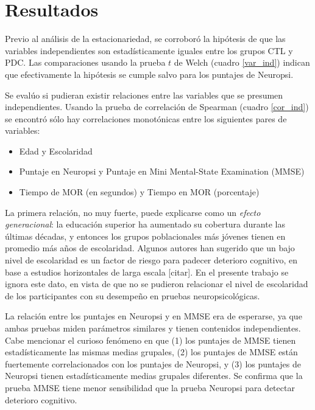 
\chapter{Resultados}

Previo al análisis de la estacionariedad, se corroboró la hipótesis de que las variables 
independientes son estadísticamente iguales entre los grupos CTL y PDC. Las comparaciones
usando la prueba $t$ de Welch (cuadro \ref{var_ind}) indican que efectivamente la hipótesis se cumple salvo
para los puntajes de Neuropsi.

Se evalúo si pudieran existir relaciones entre las variables que se presumen independientes.
Usando la prueba de correlación de Spearman (cuadro \ref{cor_ind}) se encontró sólo hay 
correlaciones monotónicas entre los siguientes pares de variables:
\begin{itemize}
\item Edad y Escolaridad
\item Puntaje en Neuropsi y Puntaje en Mini Mental-State Examination (MMSE)
\item Tiempo de MOR (en segundos) y Tiempo en MOR (porcentaje)
\end{itemize}

La primera relación, no muy fuerte, puede explicarse como un \textit{efecto generacional}: la educación 
superior ha aumentado su cobertura durante las últimas décadas, y entonces los grupos poblacionales 
más jóvenes tienen en promedio más años de escolaridad. 
%
Algunos autores han sugerido que un bajo nivel de escolaridad es un factor de riesgo para padecer
deterioro cognitivo, en base a estudios horizontales de larga escala [citar].
%
En el presente trabajo se ignora este dato, en vista de que no se pudieron relacionar el nivel de 
escolaridad de los participantes con su desempeño en pruebas neuropsicológicas.

La relación entre los puntajes en Neuropsi y en MMSE era de esperarse, ya que ambas pruebas miden
parámetros similares y tienen contenidos independientes. Cabe mencionar el curioso fenómeno en que (1) 
los puntajes de MMSE
tienen estadísticamente las mismas medias grupales, (2) los puntajes de MMSE están 
fuertemente correlacionados con los puntajes de Neuropsi, y (3) los puntajes de Neuropsi
tienen estadísticamente medias grupales diferentes. Se confirma que la prueba MMSE
tiene menor sensibilidad que la prueba Neuropsi para detectar deterioro cognitivo.

